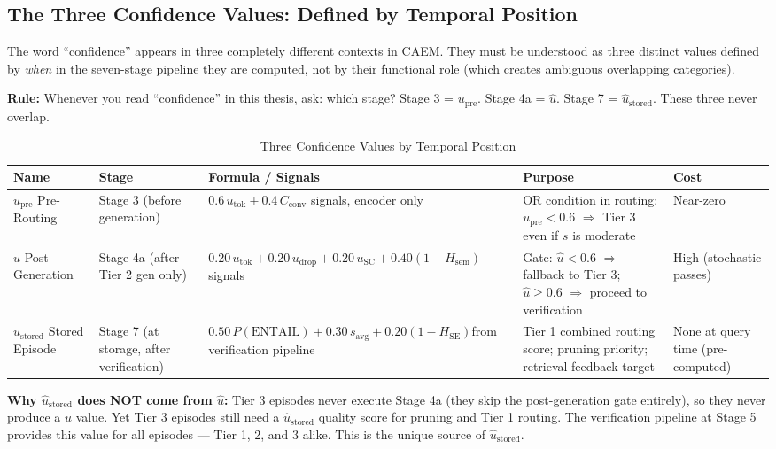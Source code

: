 \documentclass[12pt,a4paper]{article}
\theoremstyle{definition}
\newcommand{\caem}{\textsc{CAEM}}
\newcommand{\upre}{u_{\text{pre}}}
\newcommand{\uhat}{\hat{u}}
\newcommand{\ustored}{\hat{u}_{\text{stored}}}
\newcommand{\Cconv}{C_{\text{conv}}}
\begin{document}
\subsection{The Three Confidence Values: Defined by Temporal Position}
\label{subsec:three-confidence}

The word ``confidence'' appears in three completely different contexts in \caem{}. They must be understood as three distinct values defined by \textit{when} in the seven-stage pipeline they are computed, not by their functional role (which creates ambiguous overlapping categories).

\begin{keyinsightbox}
\textbf{Rule:} Whenever you read ``confidence'' in this thesis, ask: which stage? Stage 3 = $\upre$. Stage 4a = $\uhat$. Stage 7 = $\ustored$. These three never overlap.
\end{keyinsightbox}

\begin{table}[h]
\centering
\caption{Three Confidence Values by Temporal Position}
\small
\begin{tabular}{llp{3.5cm}p{3.5cm}p{2.5cm}}
\toprule
\textbf{Name} & \textbf{Stage} & \textbf{Formula / Signals} & \textbf{Purpose} & \textbf{Cost} \\
\midrule
$\upre$ Pre-Routing & Stage 3 (before generation) & $0.6\,u_{\text{tok}} + 0.4\,\Cconv$\newline 2 signals, encoder only & OR condition in routing: $\upre < 0.6$ $\Rightarrow$ Tier 3 even if $s$ is moderate & Near-zero \\
\midrule
$\uhat$ Post-Generation & Stage 4a (after Tier 2 gen only) & $0.20\,u_{\text{tok}} + 0.20\,u_{\text{drop}} + 0.20\,u_{\text{SC}} + 0.40(1{-}H_{\text{sem}})$\newline 4 signals & Gate: $\uhat < 0.6$ $\Rightarrow$ fallback to Tier 3; $\uhat \geq 0.6$ $\Rightarrow$ proceed to verification & High (stochastic passes) \\
\midrule
$\ustored$ Stored Episode & Stage 7 (at storage, after verification) & $0.50\,P(\text{ENTAIL}) + 0.30\,s_{\text{avg}} + 0.20(1{-}H_{\text{SE}})$\newline from verification pipeline & Tier 1 combined routing score; pruning priority; retrieval feedback target & None at query time (pre-computed) \\
\bottomrule
\end{tabular}
\end{table}

\textbf{Why $\ustored$ does NOT come from $\uhat$:} Tier 3 episodes never execute Stage 4a (they skip the post-generation gate entirely), so they never produce a $\uhat$ value. Yet Tier 3 episodes still need a $\ustored$ quality score for pruning and Tier 1 routing. The verification pipeline at Stage 5 provides this value for all episodes — Tier 1, 2, and 3 alike. This is the unique source of $\ustored$.
\end{document}
